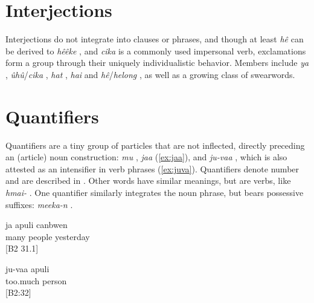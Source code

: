 
\section{Interjections}
Interjections do not integrate into clauses or phrases, and though at least \textit{hê}  can be derived to \textit{hêêke} , and \textit{cika}  is a commonly used impersonal verb, exclamations form a group through their uniquely individualistic behavior.
Members include \textit{ya} , \textit{ûhû}\slash\textit{cika} , \textit{hat} , \textit{hai}  and \textit{hê}\slash\textit{helong} , as well as a growing class of swearwords. 

\section{Quantifiers}
Quantifiers are a tiny group of particles that are not inflected, directly preceding an (article) noun construction: \textit{mu} , \textit{jaa}  (\ref{ex:jaa}), and \textit{ju-vaa} , which is also attested as an intensifier in verb phrases (\ref{ex:juva}). Quantifiers denote number and are described in . Other words have similar meanings, but are verbs, like \textit{hmai-} . One quantifier similarly integrates the noun phrase, but bears possessive suffixes: \textit{meeka-n} .



	\ea\label{ex:jaa}
	\gll ja apuli canbwen\\
	 many people yesterday\\
	\glt {} {[B2 31.1]}
\z	
	
	\ea\label{ex:juva}
	\gll ju-vaa apuli\\
	 too.much person\\
	\glt {} {[B2:32]}
	\z
	


